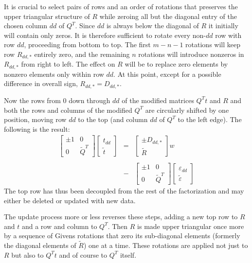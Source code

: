 It is crucial to select pairs of rows and an order of rotations that preserves the upper triangular structure of $R$
while zeroing all but the diagonal entry of the chosen column $dd$ of $Q^T$.
Since $dd$ is always below the diagonal of $R$ it initially will contain only zeros.
It is therefore sufficient to rotate every non-$dd$ row with row $dd$, proceeding from bottom to top.
The first $m - n - 1$ rotations will keep row $R_{dd,*}$ entirely zero,
and the remaining $n$ rotations will introduce nonzeros in $R_{dd,*}$ from right to left.
The effect on $R$ will be to replace zero elements by nonzero elements only within row $dd$.
At this point, except for a possible difference in overall sign, $R_{dd,*} = D_{dd,*}$.

Now the rows from 0 down through $dd$ of the modified matrices $Q^Tt$ and $R$ and both the rows and columns of the modified $Q^T$
are circularly shifted by one position, moving row $dd$ to the top (and column $dd$ of $Q^T$ to the left edge).
The following is the result:
\begin{displaymath}
\begin{array}{lll}
    \left[\begin{array}{cc}
      \pm1  &  0 \\
      0     &  \tilde{Q}^T
   \end{array}\right]
   \left[\begin{array}{c}
      t_{dd} \\
      \tilde{t}
   \end{array}\right]
   &=&
   \left[\begin{array}{c}
      \pm D_{dd,*} \\
      \tilde{R}
   \end{array}\right] w
   \\
   \\
   &-&
   \left[\begin{array}{cc}
      \pm1  &  0 \\
      0     &  \tilde{Q}^T
   \end{array}\right]
   \left[\begin{array}{c}
      \varepsilon_{dd} \\
      \tilde{\varepsilon}
   \end{array}\right]
\end{array}
\end{displaymath}
The top row has thus been decoupled from the rest of the factorization and may either be deleted or updated with new data.

The update process more or less reverses these steps, adding a new top row to $R$ and $t$ and a row and column to $Q^T$.
Then $R$ is made upper triangular once more by a sequence of Givens rotations that zero its sub-diagonal elements
(formerly the diagonal elements of $\tilde{R}$) one at a time.
These rotations are applied not just to $R$ but also to $Q^Tt$ and of course to $Q^T$ itself.

